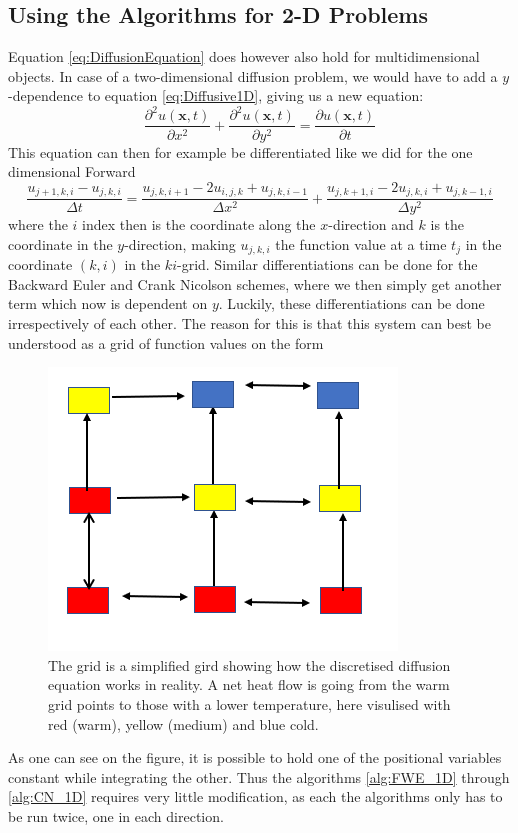 \documentclass[a4paper,10pt,english]{article}
\renewcommand{\vec}[1]{\mathbf{#1}}
\begin{document}
\subsection*{Using the Algorithms for 2-D Problems}
Equation \ref{eq:DiffusionEquation} does however also hold for multidimensional objects. In case of a two-dimensional diffusion problem, we would have to add a $y$-dependence to equation \ref{eq:Diffusive1D}, giving us a new equation:
\begin{equation}
\dfrac{\partial^2 u(\vec{x},t)}{\partial x^2} + \dfrac{\partial^2 u(\vec{x},t)}{\partial y^2 } = \dfrac{\partial u(\vec{x},t)}{\partial t}
\label{eq:Diffusive2D}
\end{equation}
This equation can then for example be differentiated like we did for the one dimensional Forward 
\begin{equation}
\dfrac{u_{j+1,k,i} - u_{j,k,i}}{\Delta t} = \dfrac{u_{j,k,i+1} - 2 u_{i,j,k} + u_{j,k,i-1}}{\Delta x^2} + \dfrac{u_{j,k+1,i} - 2u_{j,k,i} + u_{j,k-1,i}}{\Delta y^2}
\label{eq:2DFWEuler}
\end{equation}
where the $i$ index then is the coordinate along the $x$-direction and $k$ is the coordinate in the $y$-direction, making $u_{j,k,i}$ the function value at a time $t_j$ in the coordinate $(k,i)$ in the $ki$-grid. Similar differentiations can be done for the Backward Euler and Crank Nicolson schemes, where we then simply get another term which now is dependent on $y$. Luckily, these differentiations can be done irrespectively of each other. The reason for this is that this system can best be understood as a grid of function values on the form 
\begin{figure}[H]
\centering
\includegraphics[scale=0.8]{grid.png}
\caption{The grid is a simplified gird showing how the discretised diffusion equation works in reality. A net heat flow is going from the warm grid points to those with a lower temperature, here visulised with red (warm), yellow (medium) and blue cold.\label{fig:tempgrid}}
\end{figure}
As one can see on the figure, it is possible to hold one of the positional variables constant while integrating the other. Thus the algorithms \ref{alg:FWE_1D} through \ref{alg:CN_1D} requires very little modification, as each the algorithms only has to be run twice, one in each direction. 
\end{document}
